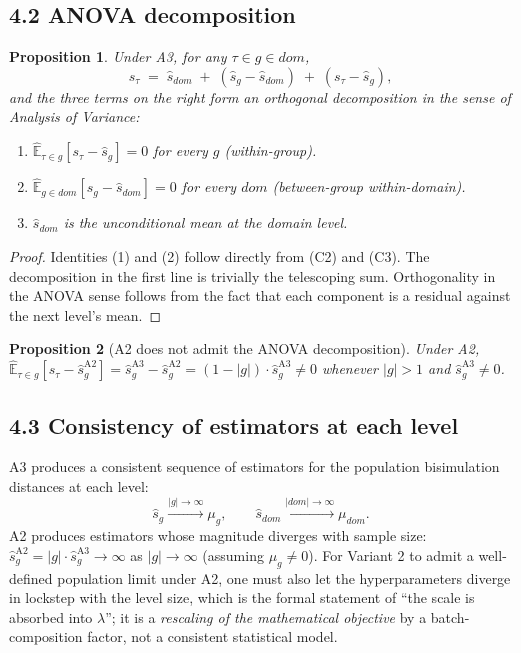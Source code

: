 \documentclass[11pt]{article}
\newcommand{\Ehat}{\widehat{\mathbb{E}}}
\newtheorem{proposition}{Proposition}
\begin{document}
\subsection*{4.2 ANOVA decomposition}

\begin{proposition}
\label{prop:anova}
Under A3, for any $\tau \in g \in dom$,
\[
s_\tau \;=\; \widehat s_{dom} \;+\; (\widehat s_g - \widehat s_{dom}) \;+\; (s_\tau - \widehat s_g),
\]
and the three terms on the right form an orthogonal decomposition in the
sense of Analysis of Variance:
\begin{enumerate}
\item $\Ehat_{\tau\in g}[s_\tau - \widehat s_g] = 0$ for every $g$ (within-group).
\item $\Ehat_{g\in dom}[\widehat s_g - \widehat s_{dom}] = 0$ for every $dom$ (between-group within-domain).
\item $\widehat s_{dom}$ is the unconditional mean at the domain level.
\end{enumerate}
\end{proposition}

\begin{proof}
Identities (1) and (2) follow directly from (C2) and (C3). The decomposition
in the first line is trivially the telescoping sum. Orthogonality in the
ANOVA sense follows from the fact that each component is a residual
against the next level's mean.
\end{proof}

\begin{proposition}[A2 does not admit the ANOVA decomposition]
Under A2, $\Ehat_{\tau\in g}[s_\tau - \widehat s_g^{\text{A2}}] =
\widehat s_g^{\text{A3}} - \widehat s_g^{\text{A2}}
= (1-|g|)\cdot\widehat s_g^{\text{A3}} \neq 0$ whenever $|g|>1$ and
$\widehat s_g^{\text{A3}}\neq 0$.
\end{proposition}

\subsection*{4.3 Consistency of estimators at each level}

A3 produces a consistent sequence of estimators for the population
bisimulation distances at each level:
\[
\widehat s_g \xrightarrow{|g|\to\infty} \mu_g, \qquad
\widehat s_{dom} \xrightarrow{|dom|\to\infty} \mu_{dom}.
\]
A2 produces estimators whose magnitude diverges with sample size:
$\widehat s_g^{\text{A2}} = |g|\cdot\widehat s_g^{\text{A3}} \to \infty$ as
$|g|\to\infty$ (assuming $\mu_g\neq 0$). For Variant 2 to admit a
well-defined population limit under A2, one must also let the
hyperparameters diverge in lockstep with the level size, which is the
formal statement of ``the scale is absorbed into $\lambda$''; it is a
\emph{rescaling of the mathematical objective} by a batch-composition
factor, not a consistent statistical model.
\end{document}
